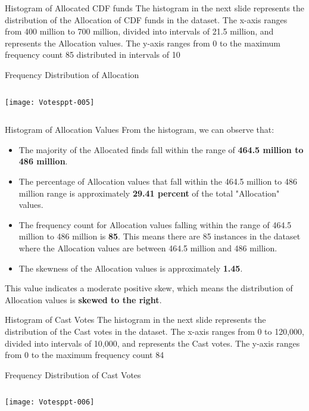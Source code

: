\documentclass{beamer}
\begin{document}
\begin{frame}[fragile]{Histogram of Allocated CDF funds}
The histogram in the next slide represents the distribution of the Allocation of CDF funds in the dataset. The x-axis ranges from 400 million to 700 million, divided into intervals of 21.5 million, and represents the Allocation values. The y-axis ranges from 0 to the maximum frequency count 85 distributed in intervals of 10
\end{frame}

\begin{frame}[fragile]{Frequency Distribution of Allocation}
\begin{columns}[c] %
\texttt{[image: Votesppt-005]}
\end{columns}
\end{frame}

\begin{frame}{Histogram of Allocation Values}
From the histogram, we can observe that:
\begin{itemize}
\item The majority of the Allocated finds fall within the range of \textbf{464.5 million to 486 million}.
\item The percentage of Allocation values that fall within the 464.5 million to 486 million range is approximately \textbf{29.41 percent} of the total "Allocation" values.
\item The frequency count for Allocation values falling within the range of 464.5 million to 486 million is \textbf{85}. This means there are 85 instances in the dataset where the Allocation values are between 464.5 million and 486 million.
\item The skewness of the Allocation values is approximately \textbf{1.45}.
\end{itemize}
This value indicates a moderate positive skew, which means the distribution of Allocation values is \textbf{skewed to the right}.
\end{frame}

\begin{frame}[fragile]{Histogram of Cast Votes}
The histogram in the next slide represents the distribution of the Cast votes in the dataset. The x-axis ranges from 0 to 120,000, divided into intervals of 10,000, and represents the Cast votes. The y-axis ranges from 0 to the maximum frequency count 84
\end{frame}

\begin{frame}[fragile]{Frequency Distribution of Cast Votes}
\begin{columns}[c] %
\texttt{[image: Votesppt-006]}
\end{columns}
\end{frame}
\end{document}
